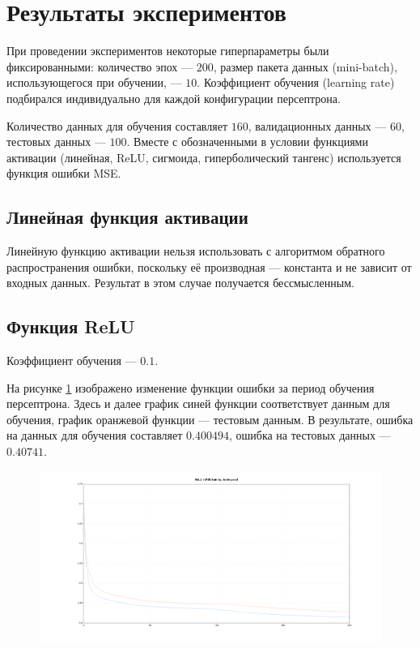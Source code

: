 \documentclass[a4paper, 14pt]{extarticle}
\begin{document}
\section{Результаты экспериментов}

При проведении экспериментов некоторые гиперпараметры были фиксированными: количество эпох --- $200$, размер пакета данных (mini-batch),
использующегося при обучении, --- $10$. Коэффициент обучения (learning rate) подбирался индивидуально для каждой конфигурации персептрона.

Количество данных для обучения составляет $160$, валидационных данных --- $60$, тестовых данных --- $100$. Вместе с обозначенными в условии
функциями активации (линейная, ReLU, сигмоида, гиперболический тангенс) используется функция ошибки MSE.

\subsection{Линейная функция активации}

Линейную функцию активации нельзя использовать с алгоритмом обратного распространения ошибки, поскольку её производная --- константа и не 
зависит от входных данных. Результат в этом случае получается бессмысленным.

\subsection{Функция ReLU}

Коэффициент обучения --- $0.1$.

На рисунке \ref{fig:relu_mse_cost} изображено изменение функции ошибки за период обучения персептрона. Здесь и далее
график синей функции соответствует данным для обучения, график оранжевой функции --- тестовым данным. В результате, ошибка на данных
для обучения составляет $0.400494$, ошибка на тестовых данных --- $0.40741$.

\begin{figure}[!htb]
  \centering\includegraphics[width=\textwidth]{images/relu_mse_cost.png}
  \caption{}
  \label{fig:relu_mse_cost}
\end{figure}
\end{document}
